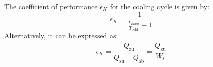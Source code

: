 The coefficient of performance \( \epsilon_K \) for the cooling cycle is given by:  
\[
\epsilon_K = \frac{1}{\frac{T_{\text{warm}}}{T_{\text{cold}}} - 1}
\]  
Alternatively, it can be expressed as:  
\[
\epsilon_K = \frac{\dot{Q}_{\text{zu}}}{\dot{Q}_{\text{zu}} - \dot{Q}_{\text{ab}}} = \frac{\dot{Q}_{\text{zu}}}{W_t}
\]